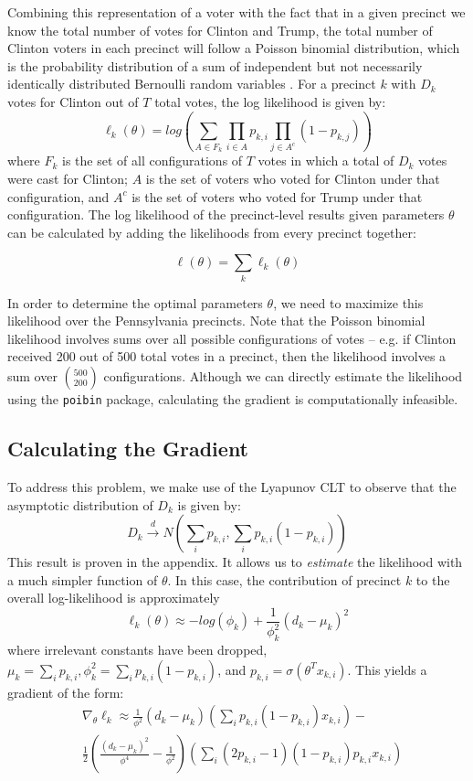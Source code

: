\documentclass[10pt, letterpaper]{article}
\begin{document}
\begin{multicols}{2}
Combining this representation of a voter with the fact that in a given precinct we know the total number of votes for Clinton and Trump, the total number of Clinton voters in each precinct will follow a Poisson binomial distribution, which is the probability distribution of a sum of independent but not necessarily identically distributed Bernoulli random variables \cite{Poibi}. For a precinct $k$ with $D_k$ votes for Clinton out of $T$ total votes, the log likelihood is given by:
\[ \ell_k(\theta) = log \left( \sum_{A \in F_k} \prod_{i \in A} p_{k,i} \prod_{j \in A^c}(1 - p_{k, j}) \right) \]
where $F_k$ is the set of all configurations of $T$ votes in which a total of $D_k$ votes were cast for Clinton; $A$ is the set of voters who voted for Clinton under that configuration, and $A^c$ is the set of voters who voted for Trump under that configuration. The log likelihood of the precinct-level results given parameters $\theta$ can be calculated by adding the likelihoods from every precinct together:

$$\ell(\theta) = \sum_k \ell_k(\theta)$$

In order to determine the optimal parameters $\theta$, we need to maximize this likelihood over the Pennsylvania precincts. Note that the Poisson binomial likelihood involves sums over all possible configurations of votes -- e.g. if Clinton received 200 out of 500 total votes in a precinct, then the likelihood involves a sum over $500 \choose 200$ configurations. Although we can directly estimate the likelihood using the \texttt{poibin} package, calculating the gradient is computationally infeasible.

\subsection{Calculating the Gradient}

To address this problem, we make use of the Lyapunov CLT \cite{LyapunovCondition} to observe that the asymptotic distribution of $D_k$ is given by: 
\[ D_k \stackrel{d} \longrightarrow N \left(\sum_{i} p_{k,i}, \sum_{i} p_{k, i}(1-p_{k, i}) \right) \] 
This result is proven in the appendix. It allows us to \emph{estimate} the likelihood with a much simpler function of $\theta$. In this case, the contribution of precinct $k$ to the overall log-likelihood is approximately
\[ \ell_k(\theta) \approx -log \left( \phi_k\right) + \frac{1}{\phi_k^2} \left( d_k -\mu_k \right)^2 \]
where irrelevant constants have been dropped, $\mu_k =  \sum_{i} p_{k, i}, \phi_k^2 = \sum_{i} p_{k, i}(1-p_{k, i})$, and $p_{k, i} = \sigma(\theta^T x_{k, i})$. This yields a gradient of the form: 
\begin{align*}
&\nabla_{\theta} \ell_k \approx \frac{1}{\phi^2} (d_k - \mu_k) \left( \sum_i p_{k, i} (1 - p_{k, i}) x_{k, i} \right)-\\&  \frac{1}{2} \left(\frac{(d_k - \mu_k)^2}{\phi^4} - \frac{1}{\phi^2} \right) \left( \sum_{i} (2 p_{k, i} - 1)(1-p_{k, i})p_{k, i}x_{k, i} \right)
 \end{align*}


\end{multicols}
\end{document}
